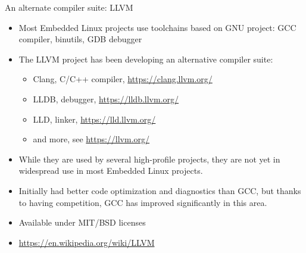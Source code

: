 \begin{frame}{An alternate compiler suite: LLVM}
  \begin{itemize}
  \item Most Embedded Linux projects use toolchains based on GNU
        project: GCC compiler, binutils, GDB debugger
  \item The LLVM project has been developing an alternative compiler suite:
    \begin{itemize}
    \item Clang, C/C++ compiler, \url{https://clang.llvm.org/}
    \item LLDB, debugger, \url{https://lldb.llvm.org/}
    \item LLD, linker, \url{https://lld.llvm.org/}
    \item and more, see \url{https://llvm.org/}
    \end{itemize}
  \item While they are used by several high-profile projects, they are
        not yet in widespread use in most Embedded Linux projects.
  \item Initially had better code optimization and diagnostics than
        GCC, but thanks to having competition, GCC has improved
        significantly in this area.
  \item Available under MIT/BSD licenses
  \item \url{https://en.wikipedia.org/wiki/LLVM}
  \end{itemize}
\end{frame}
